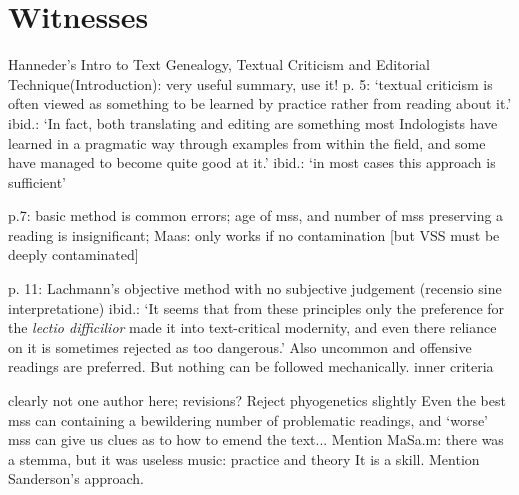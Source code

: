\section{Witnesses}
\frenchspacing

Hanneder's Intro to Text Genealogy, Textual Criticism 
and Editorial Technique(Introduction): very useful summary, use it!
p. 5: `textual criticism is often viewed as something to be learned by practice rather from reading about it.'
ibid.: `In fact, both translating and editing are something most Indologists have learned in a pragmatic
way through examples from within the field, and some have managed to become quite good at it.'
ibid.: `in most cases this approach is sufficient'

p.7: basic method is common errors; age of mss, and number of mss preserving a reading is insignificant; Maas: only works if no contamination [but VSS must be deeply contaminated]

p. 11: Lachmann's objective method with no subjective judgement (recensio sine interpretatione) 
ibid.: `It seems that from these principles only the preference for the \textit{lectio difficilior} 
made it into text-critical modernity, and
even there reliance on it is sometimes rejected as too dangerous.' Also uncommon and offensive readings are preferred. But nothing can be followed mechanically. inner criteria

clearly not one author here; revisions?
Reject phyogenetics slightly
Even the best mss can containing a bewildering number of problematic readings, and
`worse' mss can give us clues as to how to emend the text...
Mention MaSa.m: there was a stemma, but it was useless
music: practice and theory
It is a skill.
Mention Sanderson's approach. 

